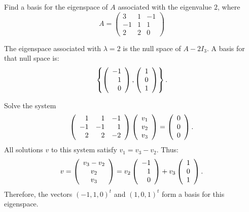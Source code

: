 \documentclass{ximera}
\begin{document}
\begin{exercise} \label{c10.2.2}
Find a basis for the eigenspace of $A$ associated with the eigenvalue $2$, where  
\[
A = \left(\begin{array}{rrr} 3 & 1 & -1 \\ -1 & 1 & 1 \\ 2 & 2 & 0 
\end{array}\right)
\]

\begin{solution}

\ans  The eigenspace associated with $\lambda=2$ is the null space of $A-2I_3$.  
A basis for that null space is:
\[
\left\{\left(\begin{array}{r} -1 \\ 1 \\ 0\end{array}\right), \left(\begin{array}{r} 1 \\ 0 \\ 1\end{array}\right)\right\}.
\]

\soln Solve the system
\[
\left(\begin{array}{rrr} 1 & 1 & -1 \\ -1 & -1 & 1 \\ 2 & 2 & -2\end{array}\right)\left(\begin{array}{r} v_1 \\ v_2 \\ v_3\end{array}\right) =
\left(\begin{array}{r} 0 \\ 0 \\ 0\end{array}\right).
\]
All solutions $v$ to this system satisfy $v_1 = v_3 - v_2$.  Thus:
\[
v = \left(\begin{array}{c} v_3 - v_2 \\ v_2 \\ v_3\end{array}\right) = v_2\left(\begin{array}{r} -1 \\ 1 \\ 0\end{array}\right) +
v_3\left(\begin{array}{r} 1 \\ 0 \\ 1\end{array}\right).
\]
Therefore, the vectors $(-1,1,0)^t$ and $(1,0,1)^t$ form a basis
for this eigenspace.

\end{solution}
\end{exercise}
\end{document}
